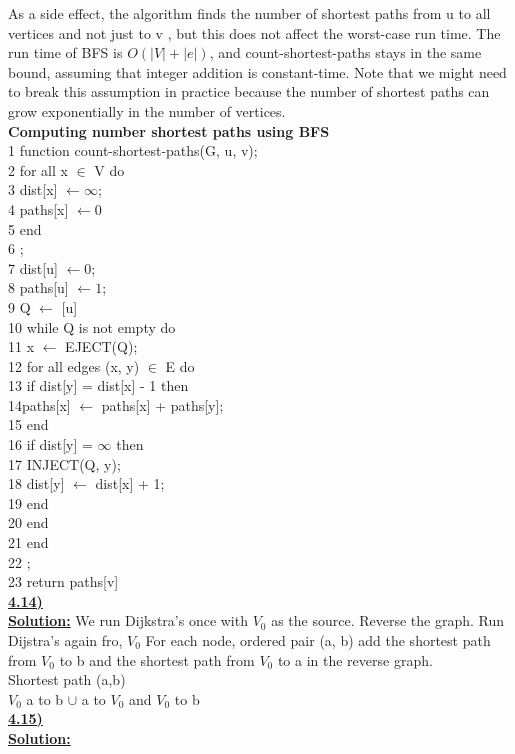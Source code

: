 \documentclass{article}
\begin{document}
As a side effect, the algorithm finds the number of shortest paths from u to all vertices and not just to v , but this does not affect the worst-case run time. The run time of BFS is $O(|V| + |e|)$, and count-shortest-paths stays in the same bound, assuming that integer addition is constant-time. Note that we might need to break this assumption in practice because the number of shortest paths can grow exponentially in the number of vertices. \\

\noindent \textbf{Computing number shortest paths using BFS} \\
1 function count-shortest-paths(G, u, v); \\
2 for all x $\in$ V do \\
3 \indent dist[x] $\leftarrow \infty$; \\
4 \indent paths[x] $\leftarrow 0$ \\
5 end \\
6 ; \\
7 dist[u] $\leftarrow 0$; \\
8 paths[u] $\leftarrow 1$; \\
9 Q $\leftarrow$ [u]\\
10 while Q is not empty do \\
11 \indent x $\leftarrow$ EJECT(Q); \\
12 \indent for all edges (x, y) $\in$ E do \\
13 \indent \indent if dist[y] = dist[x] - 1 then \\
14\indent \indent \indent paths[x] $\leftarrow$ paths[x] + paths[y]; \\
15 \indent \indent end \\
16 \indent \indent if dist[y] = $\infty$ then \\
17 \indent \indent \indent INJECT(Q, y); \\
18 \indent \indent \indent dist[y] $\leftarrow$ dist[x] + 1; \\
19 \indent \indent end \\
20 \indent end \\
21 end \\
22 ; \\
23 return paths[v] \\

\vspace{.2in}
\noindent \textbf{\underline{4.14)}} \\

\noindent \textbf{\underline{Solution:}}  We run Dijkstra's once with $V_{0}$ as the source. Reverse the graph. Run Dijstra's again fro, $V_{0}$ For each node, ordered pair (a, b) add the shortest path from $V_{0}$ to b and the shortest path from $V_{0}$ to a in the reverse graph.\\
\indent Shortest path (a,b)\\
\indent $V_{0}$ a to b $\cup$ a to $V_{0}$ and $V_{0}$ to b \\

\vspace{.2in}
\noindent \textbf{\underline{4.15)}} \\

\noindent \textbf{\underline{Solution:}}  \\
\end{document}
